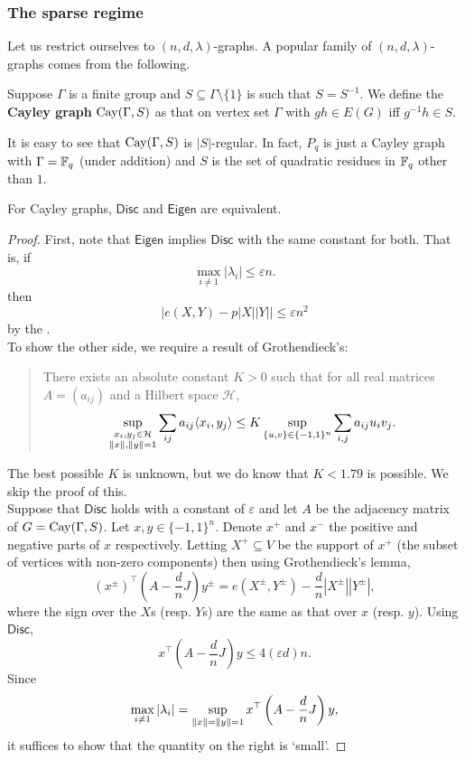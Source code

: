 		\subsubsection{The sparse regime}

			Let us restrict ourselves to $(n,d,\lambda)$-graphs. A popular family of $(n,d,\lambda)$-graphs comes from the following.

			\begin{fdef}
				Suppose $\Gamma$ is a finite group and $S\subseteq\Gamma\setminus\{1\}$ is such that $S = S^{-1}$. We define the \textbf{Cayley graph} $\operatorname{Cay}(\Gamma,S)$ as that on vertex set $\Gamma$ with $gh \in E(G)$ iff $g^{-1} h \in S$.
			\end{fdef}

			It is easy to see that $\operatorname{Cay}(\Gamma,S)$ is $|S|$-regular. In fact, $P_q$ is just a Cayley graph with $\Gamma = \mathbb{F}_q$ (under addition) and $S$ is the set of quadratic residues in $\mathbb{F}_q$ other than $1$.

			\begin{ftheo}
				For Cayley graphs, $\mathsf{Disc}$ and $\mathsf{Eigen}$ are equivalent.
			\end{ftheo}
			\begin{proof}

				First, note that $\mathsf{Eigen}$ implies $\mathsf{Disc}$ with the same constant for both. That is, if
				\[  \max_{i\ne 1} |\lambda_i| \le \varepsilon n.  \]
				then
				\[ \left| e(X,Y) - p|X||Y| \right| \le \varepsilon n^2 \]
				by the .\\
				To show the other side, we require a result of Grothendieck's:
				\begin{quote}
					There exists an absolute constant $K > 0$ such that for all real matrices $A = (a_{ij})$ and a Hilbert space $\mathcal{H}$,
					\[ \sup_{\substack{x_i,y_j \in \mathcal{H} \\ \left\lVert x\right\rVert,\left\lVert y\right\rVert = 1}} \sum_{ij} a_{ij} \langle x_i , y_j \rangle \le K \sup_{\{u,v\}\in\{-1,1\}^n} \sum_{i,j} a_{ij} u_i v_j. \]
				\end{quote}
				The best possible $K$ is unknown, but we do know that $K < 1.79$ is possible. We skip the proof of this.\\
				Suppose that $\mathsf{Disc}$ holds with a constant of $\varepsilon$ and let $A$ be the adjacency matrix of $G = \operatorname{Cay}(\Gamma,S)$. Let $x,y\in\{-1,1\}^n$. Denote $x^+$ and $x^-$ the positive and negative parts of $x$ respectively. Letting $X^+ \subseteq V$ be the support of $x^+$ (the subset of vertices with non-zero components) then using Grothendieck's lemma,
				\[ (x^\pm)^\top \left( A - \frac{d}{n} J \right) y^\pm = e(X^\pm,Y^\pm) - \frac{d}{n} |X^\pm| |Y^\pm|, \]
				where the sign over the $X$s (resp. $Y$s) are the same as that over $x$ (resp. $y$). Using $\mathsf{Disc}$,
				\[ x^\top \left( A - \frac{d}{n}J \right)y \le 4(\varepsilon d)n. \]
				Since
				\[ \max_{i \ne 1} |\lambda_i| = \sup_{\left\lVert x\right\rVert = \left\lVert y\right\rVert = 1} x^\top \left(A - \frac{d}{n}J\right) y, \]
				it suffices to show that the quantity on the right is `small'.
			\end{proof}
